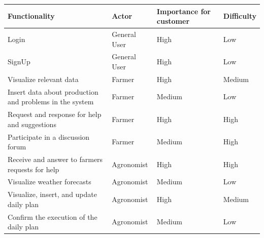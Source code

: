 \documentclass{article}
\begin{document}
    \begin{longtable}{|p{8cm}|p{2.5cm}|p{2.5cm}|p{}|}
        \hline
        \rule[-4mm]{0mm}{1cm}
            \textbf{Functionality}                                  & \textbf{Actor}&  \textbf{Importance for customer}  & \textbf{Difficulty}   \\
        \hline
        \hline
        \rule[-4mm]{0mm}{0.8cm}
            Login                                                   & General User  & High                              & Low                   \\
        \hline
        \rule[-4mm]{0mm}{0.8cm}
            SignUp                                                  & General User  & High                              & Low                   \\
        \hline
        \rule[-4mm]{0mm}{0.8cm}
            Visualize relevant data                                 & Farmer        & High                              & Medium               \\
        \hline
        \rule[-4mm]{0mm}{0.8cm}
            Insert data about production and problems in the system & Farmer        & Medium                            & Low                   \\
        \hline
        \rule[-4mm]{0mm}{0.8cm}
            Request and response for help and suggestions           & Farmer        & High                              & High                   \\
        \hline
        \rule[-4mm]{0mm}{0.8cm}
            Participate in a discussion forum                       & Farmer        & Medium                            & High                   \\
        \hline
        \rule[-4mm]{0mm}{0.8cm}
            Receive and answer to farmers requests for help         & Agronomist    & High                              & High                   \\
        \hline
        \rule[-4mm]{0mm}{0.8cm}
            Visualize weather forecasts                             & Agronomist    & Medium                            & Low                   \\
        \hline
        \rule[-4mm]{0mm}{0.8cm}
            Visualize, insert, and update daily plan                & Agronomist    & High                              & Medium                   \\
        \hline
        \rule[-4mm]{0mm}{0.8cm}
            Confirm the execution of the daily plan                 & Agronomist    & Medium                            & Low                   \\

\end{longtable}
\end{document}
